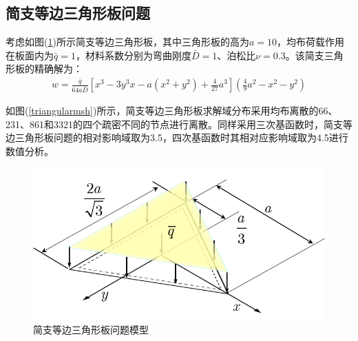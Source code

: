 \subsection{简支等边三角形板问题}
考虑如图(\ref{triangular})所示简支等边三角形板，其中三角形板的高为$a=10$，均布荷载作用在板面内为$\bar{q}=1$，材料系数分别为弯曲刚度$\bar{D}=1$、泊松比$\nu=0.3$。该简支三角形板的精确解为：
\begin{equation}
\begin{split}
    w=\frac{\bar q}{64a\bar D}[x^3-3y^3x-a(x^2+y^2)+\frac{4}{27}a^3](\frac{4}{9}a^2-x^2-y^2)
\end{split}
\end{equation}\par
如图(\ref{triangularmsh})所示，简支等边三角形板求解域分布采用均布离散的66、231、861和3321的四个疏密不同的节点进行离散。同样采用三次基函数时，简支等边三角形板问题的相对影响域取为3.5，四次基函数时其相对应影响域取为4.5进行数值分析。\par
\begin{figure}[H]
    \centering
    \includegraphics[scale=0.7]{figure/PHR/T/triangular.png}
    \caption{简支等边三角形板问题模型}\label{triangular}
\end{figure}

